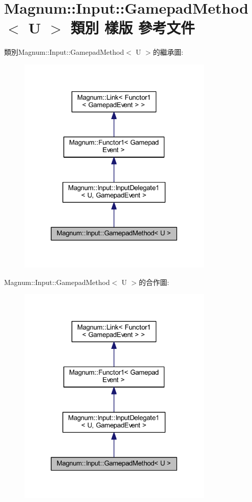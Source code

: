 \hypertarget{class_magnum_1_1_input_1_1_gamepad_method}{}\section{Magnum\+:\+:Input\+:\+:Gamepad\+Method$<$ U $>$ 類別 樣版 參考文件}
\label{class_magnum_1_1_input_1_1_gamepad_method}


類別\+Magnum\+:\+:Input\+:\+:Gamepad\+Method$<$ U $>$的繼承圖\+:\nopagebreak
\begin{figure}[H]
\begin{center}
\leavevmode
\includegraphics[width=266pt]{class_magnum_1_1_input_1_1_gamepad_method__inherit__graph}
\end{center}
\end{figure}


Magnum\+:\+:Input\+:\+:Gamepad\+Method$<$ U $>$的合作圖\+:\nopagebreak
\begin{figure}[H]
\begin{center}
\leavevmode
\includegraphics[width=266pt]{class_magnum_1_1_input_1_1_gamepad_method__coll__graph}
\end{center}
\end{figure}
